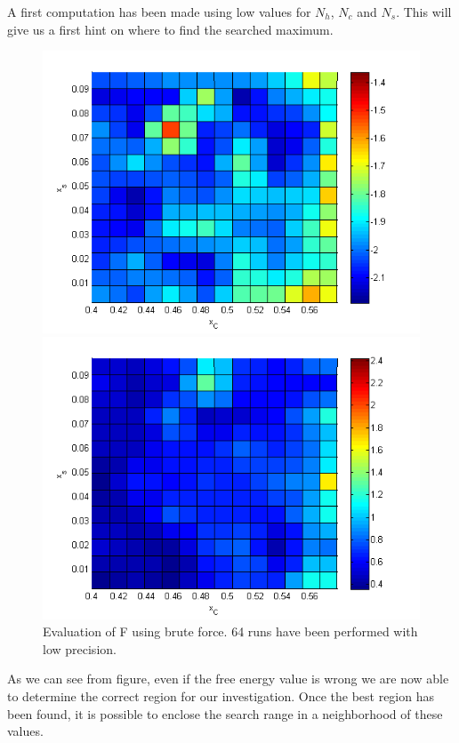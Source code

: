 A first computation has been made using low values for $N_h$, $N_c$ and $N_s$. This will give us a first hint on where to find the searched maximum.

\begin{figure}[h]
	\centering
		\includegraphics[scale=0.8]{img/generic_F.png}

		\includegraphics[scale=0.8]{img/generic_err.png}
\caption{Evaluation of F using brute force. 64 runs have been performed with low precision. }
\end{figure}

As we can see from figure, even if the free energy value is wrong we are now able to determine the correct region for our investigation.
Once the best region has been found, it is possible to enclose the search range in a neighborhood of these values.

